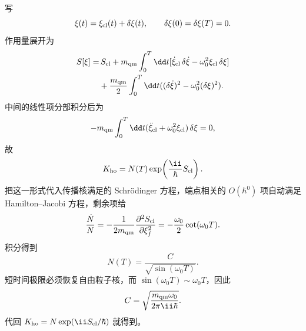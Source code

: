 \begin{exbox}[谐振子传播核]
写
\begin{equation*}
 \xi(t)=\xi_{\rm cl}(t)+\delta\xi(t),
 \qquad \delta\xi(0)=\delta\xi(T)=0.
\end{equation*}
作用量展开为
\begin{align*}
 S[\xi]
 =&\,S_{\rm cl}
 +m_{\rm qm}\int_0^T\dd t
 [\dot\xi_{\rm cl}\,\delta\dot\xi-\omega_0^2\xi_{\rm cl}\,\delta\xi]\\
 &+\frac{m_{\rm qm}}2\int_0^T\dd t
 ((\delta\dot\xi)^2-\omega_0^2(\delta\xi)^2).
\end{align*}
中间的线性项分部积分后为
\begin{equation*}
 -m_{\rm qm}\int_0^T\dd t
 (\ddot\xi_{\rm cl}+\omega_0^2\xi_{\rm cl})\,\delta\xi=0,
\end{equation*}
故
\begin{equation*}
 K_{\rm ho}=N(T)\exp\!\left(\frac{\ii}{\hbar}S_{\rm cl}\right).
\end{equation*}
把这一形式代入传播核满足的 Schr\"odinger 方程，端点相关的 $O(\hbar^0)$ 项自动满足 Hamilton--Jacobi 方程，剩余项给
\begin{equation*}
 \frac{\dot N}{N}
 =-\frac{1}{2m_{\rm qm}}
 \frac{\partial^2S_{\rm cl}}{\partial\xi_f^2}
 =-\frac{\omega_0}{2}\cot(\omega_0T).
\end{equation*}
积分得到
\begin{equation*}
 N(T)=\frac{C}{\sqrt{\sin(\omega_0T)}}.
\end{equation*}
短时间极限必须恢复自由粒子核，而 $\sin(\omega_0T)\sim\omega_0T$，因此
\begin{equation*}
 C=\sqrt{\frac{m_{\rm qm}\omega_0}{2\pi\ii\hbar}}.
\end{equation*}
代回 $K_{\rm ho}=N\exp(\ii S_{\rm cl}/\hbar)$ 就得到。
\end{exbox}






